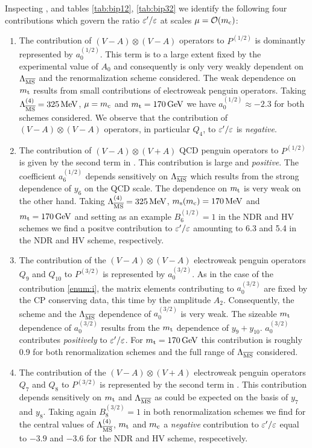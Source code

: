 Inspecting ,  and tables \ref{tab:bip12},
\ref{tab:bip32} we identify the following four contributions which
govern the ratio $\varepsilon'/\varepsilon$ at scales $\mu={\cal O}(m_{\rm c})$:
\renewcommand{\theenumi}{\roman{enumi}}
\begin{enumerate}
\item
\label{enum:i}
The contribution of $(V-A) \otimes (V-A)$ operators to $P^{(1/2)}$ is
dominantly represented by $a_0^{(1/2)}$. This term is to a large extent
fixed by the experimental value of $A_0$ and consequently is only very
weakly dependent on $\Lambda_{\overline{\rm MS}}$ and the renormalization scheme considered.
The weak dependence on $m_{\rm t}$ results from small contributions of
electroweak penguin operators.  Taking $\Lambda_{\overline{\rm MS}}^{(4)} = 325\, {\rm MeV}$,
$\mu=m_{\rm c}$ and $m_{\rm t} = 170\, {\rm GeV}$ we have $a_0^{(1/2)} \approx -2.3$ for
both schemes considered.  We observe that the contribution of $(V-A)
\otimes (V-A)$ operators, in particular $Q_4$, to $\varepsilon'/\varepsilon$ is {\em
negative}.
\item
\label{enum:ii}
The contribution of $(V-A) \otimes (V+A)$ QCD penguin operators to
$P^{(1/2)}$ is given by the second term in . This
contribution is large and {\em positive}. The coefficient $a_6^{(1/2)}$
depends sensitively on $\Lambda_{\overline{\rm MS}}$ which results from the strong dependence
of $y_6$ on the QCD scale. The dependence on $m_{\rm t}$ is very weak on the
other hand. Taking $\Lambda_{\overline{\rm MS}}^{(4)} = 325\, {\rm MeV}$, $m_{\rm s}(m_{\rm c})=170\, {\rm MeV}$ and $m_{\rm t}
= 170\, {\rm GeV}$ and setting as an example $B_6^{(1/2)} = 1$ in the NDR and
HV schemes we find a positve contribution to $\varepsilon'/\varepsilon$ amounting to 6.3
and 5.4 in the NDR and HV scheme, respectively.

\item
\label{enum:iii}
The contribution of the $(V-A) \otimes (V-A)$ electroweak penguin
operators $Q_9$ and $Q_{10}$ to $P^{(3/2)}$ is represented by
$a_0^{(3/2)}$. As in the case of the contribution \ref{enum:i}, the
matrix elements contributing to $a_0^{(3/2)}$ are fixed by the CP
conserving data, this time by the amplitude $A_2$. Consequently, the
scheme and the $\Lambda_{\overline{\rm MS}}$ dependence of $a_0^{(3/2)}$ is very weak. The
sizeable $m_{\rm t}$ dependence of $a_0^{(3/2)}$ results from the $m_{\rm t}$
dependence of $y_9 + y_{10}$. $a_0^{(3/2)}$ contributes {\em positively}
to $\varepsilon'/\varepsilon$. For $m_{\rm t} = 170\, {\rm GeV}$ this contribution is roughly 0.9 for
both renormalization schemes and the full range of $\Lambda_{\overline{\rm MS}}$ considered.
\item
\label{enum:iv}
The contribution of the $(V-A) \otimes (V+A)$ electroweak penguin
operators $Q_7$ and $Q_8$ to $P^{(3/2)}$ is represented by the second
term in . This contribution depends sensitively on $m_{\rm t}$
and $\Lambda_{\overline{\rm MS}}$ as could be expected on the basis of $y_7$ and $y_8$. Taking
again $B_8^{(3/2)}=1$ in both renormalization schemes we find for the
central values of $\Lambda_{\overline{\rm MS}}^{(4)}$, $m_{\rm t}$ and $m_{\rm c}$ a {\em
negative} contribution to $\varepsilon'/\varepsilon$ equal to $-3.9$ and $-3.6$ for the NDR
and HV scheme, respecetively.
\end{enumerate}
\renewcommand{\theenumi}{\arabic{enumi}}

